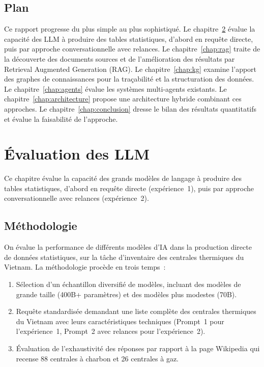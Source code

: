 \documentclass[a4paper,11pt]{report}
\begin{document}
\section{Plan}

Ce rapport progresse du plus simple au plus sophistiqué. Le chapitre~\ref{chap:evaluation} évalue la capacité des LLM à produire des tables statistiques, d'abord en requête directe, puis par approche conversationnelle avec relances. Le chapitre~\ref{chap:rag} traite de la découverte des documents sources et de l'amélioration des résultats par Retrieval Augmented Generation (RAG). Le chapitre~\ref{chap:kg} examine l'apport des graphes de connaissances pour la traçabilité et la structuration des données. Le chapitre~\ref{chap:agents} évalue les systèmes multi-agents existants. Le chapitre~\ref{chap:architecture} propose une architecture hybride combinant ces approches. Le chapitre~\ref{chap:conclusion} dresse le bilan des résultats quantitatifs et évalue la faisabilité de l'approche.

\chapter{Évaluation des LLM}\label{chap:evaluation}

Ce chapitre évalue la capacité des grands modèles de langage à produire des tables statistiques, d'abord en requête directe (expérience~1), puis par approche conversationnelle avec relances (expérience~2).

\section{Méthodologie}

On évalue la performance de différents modèles d'IA dans la production directe de données statistiques, sur la tâche d'inventaire des centrales thermiques du Vietnam. La méthodologie procède en trois temps~:

\begin{enumerate}
\item Sélection d'un échantillon diversifié de modèles, incluant des modèles de grande taille (400B+ paramètres) et des modèles plus modestes (70B).
\item Requête standardisée demandant une liste complète des centrales thermiques du Vietnam avec leurs caractéristiques techniques (Prompt~1 pour l'expérience~1, Prompt~2 avec relances pour l'expérience~2).
\item Évaluation de l'exhaustivité des réponses par rapport à la page Wikipedia \citep{TQ8TFB8H} qui recense 88 centrales à charbon et 26 centrales à gaz.
\end{enumerate}
\end{document}
